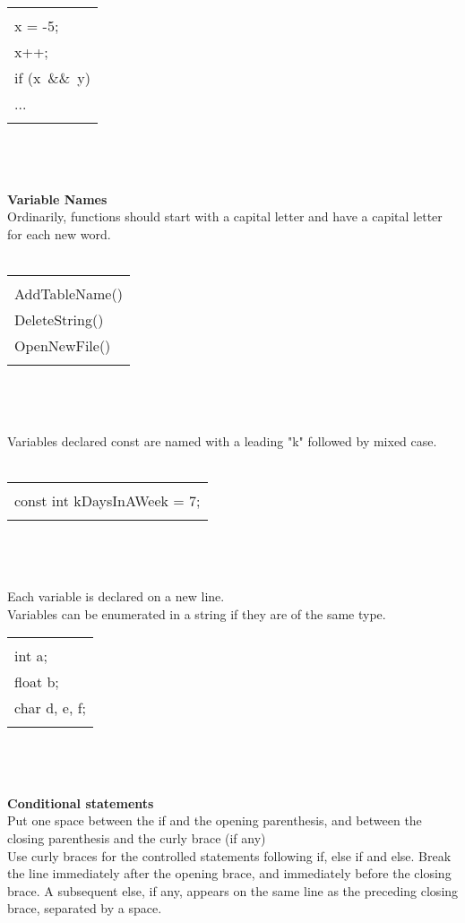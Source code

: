 \documentclass{article}
\begin{document}
\begin{tabular}{|p{}|}
\hline\\
x = -5;\\
x++;\\
if (x\ \&\&\ \!y)\\
  ...\\\\
\hline 
\end{tabular}\\ \\ \\
\textbf{\large{Variable Names}}\\
Ordinarily, functions should start with a capital letter and have a capital letter for each new word.\\ \\

\begin{tabular}{|p{}|}
\hline\\
AddTableName()\\
DeleteString()\\
OpenNewFile()\\\\
\hline 
\end{tabular}\\ \\ \\
Variables declared const are named with a leading "k" followed by mixed case.\\ \\

\begin{tabular}{|p{}|}
\hline\\
const int kDaysInAWeek = 7;\\\\
\hline 
\end{tabular}\\ \\ \\
Each variable is declared on a new line.\\
Variables can be enumerated in a string if they are of the same type.\\

\begin{tabular}{|p{}|}
\hline\\
int a;\\
float b;\\
char d, e, f;\\\\
\hline 
\end{tabular}\\ \\ \\
\textbf{\large{Conditional statements\cite{CPP2}}}\\
Put one space between the if and the opening parenthesis, and between the closing parenthesis and the curly brace (if any)\\
Use curly braces for the controlled statements following if, else if and else. Break the line immediately after the opening brace, and immediately before the closing brace. A subsequent else, if any, appears on the same line as the preceding closing brace, separated by a space.\\
\end{document}
